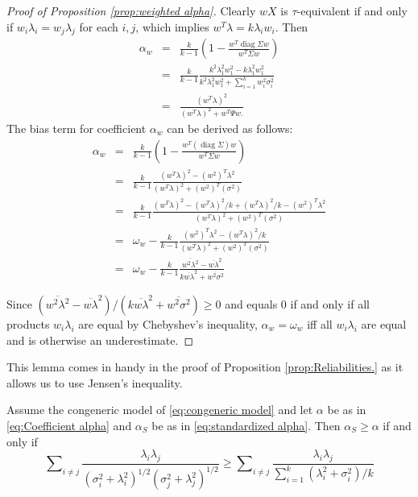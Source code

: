 \documentclass[twoside]{article}
\DeclareMathOperator{\diag}{diag}
\DeclareMathOperator{\tsum}{\textstyle \sum}
\renewcommand{\sqrt}[1]{{(#1)^{1/2}}}
\begin{document}
\begin{proof}[Proof of Proposition \ref{prop:weighted alpha}]
\label{proof:weighted alpha}Clearly $wX$ is $\tau$-equivalent
if and only if $w_{i}\lambda_{i}=w_{j}\lambda_{j}$ for each $i,j$,
which implies $w^{T}\lambda=k\lambda_{i}w_{i}$. Then
\begin{eqnarray*}
\alpha_{w} & = & \frac{k}{k-1}\left(1-\frac{w^{T}\diag\Sigma w}{w^{T}\Sigma w}\right)\\
 & = & \frac{k}{k-1}\frac{k^{2}\lambda_{1}^{2}w_{1}^{2}-k\lambda_{1}^{2}w_{1}^{2}}{k^{2}\lambda_{1}^{2}w_{1}^{2}+\tsum_{i=1}^{k}w_{i}^{2}\sigma_{i}^{2}}\\
 & = & \frac{(w^{T}\lambda)^{2}}{(w^{T}\lambda)^{2}+w^{T}\Psi w.}
\end{eqnarray*}
The bias term for coefficient $\alpha_w$ can be derived as follows:
\begin{eqnarray*}
\alpha_{w} & = & \frac{k}{k-1}(1-\frac{w^{T}(\diag\Sigma)w}{w^{T}\Sigma w})\\
 & = & \frac{k}{k-1}\frac{(w^{T}\lambda)^{2}-(w^{2})^{T}\lambda^{2}}{(w^{T}\lambda)^{2}+(w^{2})^{T}(\sigma^{2})}\\
 & = & \frac{k}{k-1}\frac{(w^{T}\lambda)^{2}-(w^{T}\lambda)^{2}/k+(w^{T}\lambda)^{2}/k-(w^{2})^{T}\lambda^{2}}{(w^{T}\lambda)^{2}+(w^{2})^{T}(\sigma^{2})}\\
 & = & \omega_{w}-\frac{k}{k-1}\frac{(w^{2})^{T}\lambda^{2}-(w^{T}\lambda)^{2}/k}{(w^{T}\lambda)^{2}+(w^{2})^{T}(\sigma^{2})}\\
 & = & \omega_{w}-\frac{k}{k-1}\frac{\overline{w^{2}\lambda^{2}}-\overline{w\lambda}^{2}}{k\overline{w\lambda}^{2}+\overline{w^{2}\sigma^{2}}}
\end{eqnarray*}

Since $(\overline{w^{2}\lambda^{2}}-\overline{w\lambda}^{2})/(k\overline{w\lambda}^{2}+\overline{w^{2}\sigma^{2}})\geq0$
and equals $0$ if and only if all products $w_i\lambda_i$ are equal by Chebyshev's inequality, $\alpha_w=\omega_w$
iff all $w_i\lambda_i$ are equal and is otherwise an underestimate. 


\end{proof}


This lemma comes in handy in the proof of Proposition \ref{prop:Reliabilities.} as it allows us to use Jensen's inequality.

\begin{lem}
Assume the congeneric model of \eqref{eq:congeneric model} and let $\alpha$ be as in \eqref{eq:Coefficient alpha} and $\alpha_S$ be as in \eqref{eq:standardized alpha}. Then $\alpha_S\geq\alpha$
if and only if
\begin{equation}
\label{eq:alpha_s_alpha_inequality}
\tsum_{i\neq j}\frac{\lambda_{i}\lambda_{j}}{\sqrt{\sigma_{i}^{2}+\lambda_{i}^{2}}\sqrt{\sigma_j^{2}+\lambda_{j}^{2}}} 
\geq
\tsum_{i\neq j}\frac{\lambda_{i}\lambda_{j}}{\tsum_{i=1}^{k}(\lambda_{i}^{2}+\sigma_{i}^{2})/k}
\end{equation}
\end{lem}
\end{document}
